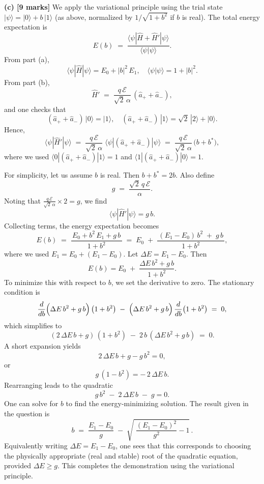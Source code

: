 \documentclass{article}
\begin{document}
\textbf{(c) [9 marks]} 
We apply the variational principle using the trial state 
\(
|\psi\rangle = |0\rangle + b\,|1\rangle
\)
(as above, normalized by \(1/\sqrt{1+b^2}\) if \(b\) is real). The total energy expectation is
\[
E(b)
\;=\;
\frac{\langle \psi | \hat{H} + \hat{H}' | \psi\rangle}{\langle \psi|\psi\rangle}.
\]
From part (a),
\[
\langle \psi|\hat{H}|\psi\rangle = E_0 + |b|^2\,E_1,
\quad
\langle \psi|\psi\rangle = 1 + |b|^2.
\]
From part (b),
\[
\hat{H}'
\;=\;
\frac{q\,\mathcal{E}}{\sqrt{2}\,\alpha}\,(\hat{a}_+ + \hat{a}_-),
\]
and one checks that
\[
(\hat{a}_+ + \hat{a}_-)\,|0\rangle = |1\rangle,
\quad
(\hat{a}_+ + \hat{a}_-)\,|1\rangle = \sqrt{2}\,|2\rangle + |0\rangle.
\]
Hence,
\[
\langle \psi|\hat{H}'|\psi\rangle
\;=\;
\frac{q\,\mathcal{E}}{\sqrt{2}\,\alpha}\;\langle \psi|(\hat{a}_+ + \hat{a}_-)|\psi\rangle
\;=\;
\frac{q\,\mathcal{E}}{\sqrt{2}\,\alpha}
\,\bigl(b + b^*\bigr),
\]
where we used 
\(\langle 0|(\hat{a}_+ + \hat{a}_-)|1\rangle = 1\)
and
\(\langle 1|(\hat{a}_+ + \hat{a}_-)|0\rangle = 1\).

For simplicity, let us assume \(b\) is real. Then \(b + b^* = 2b\). Also define
\[
g \;=\; \frac{\sqrt{2}\,q\,\mathcal{E}}{\alpha}.
\]
Noting that 
\(\tfrac{q\,\mathcal{E}}{\sqrt{2}\,\alpha} \times 2 = g\),
we find
\[
\langle \psi|\hat{H}'|\psi\rangle = g\,b.
\]
Collecting terms, the energy expectation becomes
\[
E(b)
\;=\;
\frac{\,E_0 + b^2\,E_1 + g\,b\,}{\,1 + b^2\,}
\;=\;
E_0 \;+\; \frac{\,(E_1 - E_0)\,b^2 \;+\; g\,b\,}{\,1 + b^2\,},
\]
where we used \(E_1 = E_0 + (E_1-E_0)\). Let \(\Delta E = E_1 - E_0\). Then
\[
E(b) = E_0 \;+\; \frac{\Delta E\,b^2 + g\,b}{1 + b^2}.
\]
To minimize this with respect to \(b\), we set the derivative to zero. The stationary condition is
\[
\frac{d}{db}
\Bigl(\Delta E\,b^2 + g\,b\Bigr)\,\bigl(1 + b^2\bigr)
\;-\;
\Bigl(\Delta E\,b^2 + g\,b\Bigr)\,\frac{d}{db}\bigl(1 + b^2\bigr)
\;=\; 0,
\]
which simplifies to
\[
(2\,\Delta E\,b + g)\,(1 + b^2)
\;-\;
2\,b\,(\Delta E\,b^2 + g\,b)
\;=\;
0.
\]
A short expansion yields 
\[
2\,\Delta E\,b + g - g\,b^2 = 0,
\]
or
\[
g\,(1 - b^2) = -\,2\,\Delta E\,b.
\]
Rearranging leads to the quadratic
\[
g\,b^2 \;-\; 2\,\Delta E\,b \;-\; g = 0.
\]
One can solve for \(b\) to find the energy-minimizing solution. The result given in the question is 
\[
b \;=\; \frac{E_1 - E_0}{g} 
\;-\;
\sqrt{\;\frac{(E_1 - E_0)^2}{g^2} - 1}\,.
\]
Equivalently writing \(\Delta E = E_1 - E_0\), one sees that this corresponds to choosing the physically appropriate (real and stable) root of the quadratic equation, provided 
\(\Delta E \ge g\). This completes the demonstration using the variational principle.
\end{document}
